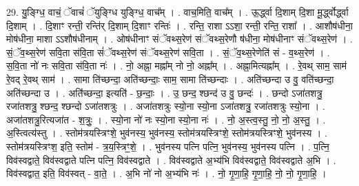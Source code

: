 \documentclass[17pt]{extarticle}
\begin{document}
29. यु॒ङ्ग्धि॒ वाचं॒ ॅवाचं॑ ॅयुङ्ग्धि युङ्ग्धि॒ वाच᳚म् । . वाच॒मिति॒ वाच᳚म् । . ऊ॒र्द्ध्वा दि॒शाम् दि॒शा मू॒र्द्ध्वोर्द्ध्वा दि॒शाम् । . दि॒शाꣳ रन्ती॒ रन्ति॑र् दि॒शाम् दि॒शाꣳ रन्तिः॑ । . रन्ति॒ राशा ऽऽशा॒ रन्ती॒ रन्ति॒ राशा᳚ । . आशौष॑धीना॒ मोष॑धीना॒ माशा ऽऽशौष॑धीनाम् । . ओष॑धीनाꣳ संॅवथ्स॒रेण॑ संॅवथ्स॒रेणौ ष॑धीना॒ मोष॑धीनाꣳ संॅवथ्स॒रेण॑ । . सं॒ॅव॒थ्स॒रेण॑ सवि॒ता स॑वि॒ता सं॑ॅवथ्स॒रेण॑ संॅवथ्स॒रेण॑ सवि॒ता । . सं॒ॅव॒थ्स॒रेणेति॑ सं - व॒थ्स॒रेण॑ । . स॒वि॒ता नो॑ नः सवि॒ता स॑वि॒ता नः॑ । . नो॒ अह्ना॒ मह्ना᳚म् नो नो॒ अह्ना᳚म् । . अह्ना॒मित्यह्ना᳚म् । . रे॒वथ् साम॒ साम॑ रे॒वद् रे॒वथ् साम॑ । . सामा ति॑च्छन्दा॒ अति॑च्छन्दाः॒ साम॒ सामा ति॑च्छन्दाः । . अति॑च्छन्दा उ वु॒ वति॑च्छन्दा॒ अति॑च्छन्दा उ । . अति॑॑च्छन्दा॒ इत्यति॑ - छ॒न्दाः॒ । . उ॒ छन्द॒ श्छन्द॑ उ वु॒ छन्दः॑ । . छन्दो ऽजा॑तशत्रु॒ रजा॑तशत्रु॒ श्छन्द॒ श्छन्दो ऽजा॑तशत्रुः । . अजा॑तशत्रुः स्यो॒ना स्यो॒ना ऽजा॑तशत्रु॒ रजा॑तशत्रुः स्यो॒ना । . अजा॑तशत्रु॒रित्यजा॑त - श॒त्रुः॒ । . स्यो॒ना नो॑ नः स्यो॒ना स्यो॒ना नः॑ । . नो॒ अ॒स्त्व॒स्तु॒ नो॒ नो॒ अ॒स्तु॒ । . अ॒स्त्वित्य॑स्तु । . स्तोम॑त्रयस्त्रिꣳशे॒ भुव॑नस्य॒ भुव॑नस्य॒ स्तोम॑त्रयस्त्रिꣳशे॒ स्तोम॑त्रयस्त्रिꣳशे॒ भुव॑नस्य । . स्तोम॑त्रयस्त्रिꣳश॒ इति॒ स्तोम॑ - त्र॒य॒स्त्रिꣳ॒॒शे॒ । . भुव॑नस्य पत्नि पत्नि॒ भुव॑नस्य॒ भुव॑नस्य पत्नि । . प॒त्नि॒ विव॑स्वद्वाते॒ विव॑स्वद्वाते पत्नि पत्नि॒ विव॑स्वद्वाते । . विव॑स्वद्वाते अ॒भ्य॑भि विव॑स्वद्वाते॒ विव॑स्वद्वाते अ॒भि । . विव॑स्वद्वात॒ इति॒ विव॑स्वत् - वा॒ते॒ । . अ॒भि नो॑ नो अ॒भ्य॑भि नः॑ । . नो॒ गृ॒णा॒हि॒ गृ॒णा॒हि॒ नो॒ नो॒ गृ॒णा॒हि॒ । \newline
\end{document}
